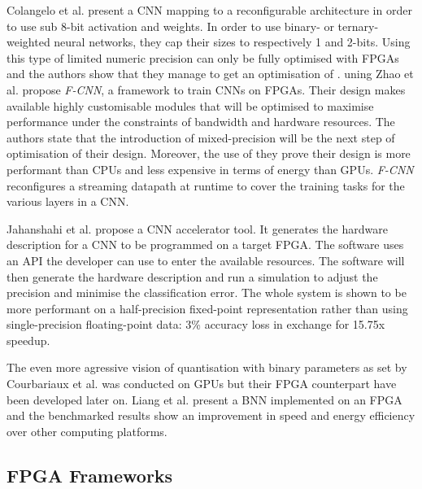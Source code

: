 Colangelo et al. \cite{Colangelo2018} present a CNN mapping to a reconfigurable architecture in order to use sub 8-bit activation and weights. In order to use binary- or ternary-weighted neural networks, they cap their sizes to respectively 1 and 2-bits. Using this type of limited numeric precision can only be fully optimised with FPGAs and the authors show that they manage to get an optimisation of .
uning 
Zhao et al. \cite{Zhao2016} propose \emph{F-CNN}, a framework to train CNNs on FPGAs. Their design makes available highly customisable modules that will be optimised to maximise performance under the constraints of bandwidth and hardware resources. The authors state that the introduction of mixed-precision will be the next step of optimisation of their design. Moreover, the use of they prove their design is more performant than CPUs and less expensive in terms of energy than GPUs. \emph{F-CNN} reconfigures a streaming datapath at runtime to cover the training tasks for the various layers in a CNN.

Jahanshahi et al. \cite{Jahanshahi2019} propose a CNN accelerator tool. It generates the hardware description for a CNN to be programmed on a target FPGA. The software uses an API the developer can use to enter the available resources. The software will then generate the hardware description and run a simulation to adjust the precision and minimise the classification error. The whole system is shown to be more performant on a half-precision fixed-point representation rather than using single-precision floating-point data: 3\% accuracy loss in exchange for 15.75x speedup.

The even more agressive vision of quantisation with binary parameters as set by Courbariaux et al. \cite{Courbariaux2016} was conducted on GPUs but their FPGA counterpart have been developed later on. Liang et al. \cite{Liang2017} present a BNN implemented on an FPGA and the benchmarked results show an improvement in speed and energy efficiency over other computing platforms.



\subsection{FPGA Frameworks}\label{fpga_framework}

